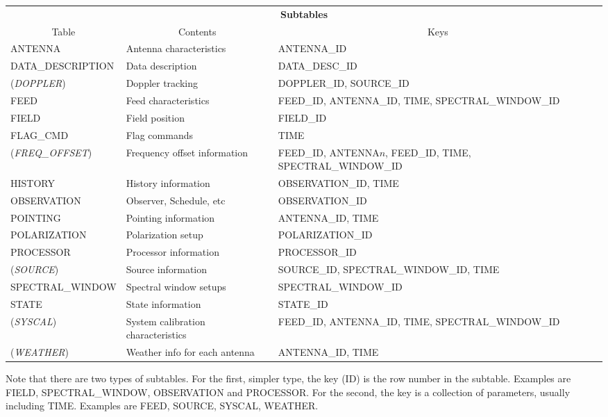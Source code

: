 \documentclass{article}
\begin{document}
\begin{tabular}{|l|p{1.5in}|p{1.6in}|} \hline
\multicolumn{3}{|c|}{\bf Subtables}\\ \cline{1-3}
\multicolumn{1}{|c|}{Table}&\multicolumn{1}{|c|}{Contents}&\multicolumn{1}{|c|}{Keys}\\ \cline{1-3}
ANTENNA& Antenna characteristics & ANTENNA\_ID \\
DATA\_DESCRIPTION & Data description & DATA\_DESC\_ID\\
({\it DOPPLER}) & Doppler tracking & DOPPLER\_ID, SOURCE\_ID \\
FEED  &          Feed characteristics & FEED\_ID, ANTENNA\_ID, TIME, SPECTRAL\_WINDOW\_ID \\
FIELD  &         Field position & FIELD\_ID  \\
FLAG\_CMD  &  Flag commands & TIME \\
({\it FREQ\_OFFSET}) & Frequency offset information & FEED\_ID, ANTENNA$n$, FEED\_ID, TIME, SPECTRAL\_WINDOW\_ID \\
HISTORY  & History information & OBSERVATION\_ID, TIME \\
OBSERVATION  &Observer, Schedule, etc & OBSERVATION\_ID \\ 
POINTING & Pointing information & ANTENNA\_ID, TIME \\
POLARIZATION &Polarization setup & POLARIZATION\_ID \\
PROCESSOR & Processor information & PROCESSOR\_ID  \\
({\it SOURCE})  &        Source information & SOURCE\_ID, SPECTRAL\_WINDOW\_ID, TIME \\
SPECTRAL\_WINDOW  &     Spectral window setups & SPECTRAL\_WINDOW\_ID \\
STATE   & State information & STATE\_ID \\
({\it SYSCAL}) &         System calibration characteristics & FEED\_ID, ANTENNA\_ID, TIME, SPECTRAL\_WINDOW\_ID \\
({\it WEATHER})  &       Weather info for each antenna & ANTENNA\_ID, TIME \\
\hline
\end{tabular}

\par
Note that there are two types of subtables. For the first, simpler
type, the key (ID) is the row number in the subtable. 
Examples are FIELD, SPECTRAL\_WINDOW, OBSERVATION
and PROCESSOR. For the second, the key is a collection of parameters,
usually including TIME. Examples are FEED, SOURCE, SYSCAL, WEATHER.
\end{document}
